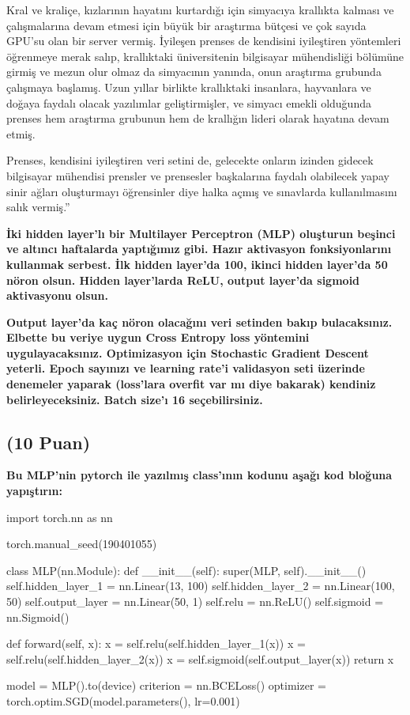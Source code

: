 \documentclass[11pt]{article}
\begin{document}
Kral ve kraliçe, kızlarının hayatını kurtardığı için simyacıya krallıkta kalması ve çalışmalarına devam etmesi için büyük bir araştırma bütçesi ve çok sayıda GPU'su olan bir server vermiş. İyileşen prenses de kendisini iyileştiren yöntemleri öğrenmeye merak salıp, krallıktaki üniversitenin bilgisayar mühendisliği bölümüne girmiş ve mezun olur olmaz da simyacının yanında, onun araştırma grubunda çalışmaya başlamış. Uzun yıllar birlikte krallıktaki insanlara, hayvanlara ve doğaya faydalı olacak yazılımlar geliştirmişler, ve simyacı emekli olduğunda prenses hem araştırma grubunun hem de krallığın lideri olarak hayatına devam etmiş.

Prenses, kendisini iyileştiren veri setini de, gelecekte onların izinden gidecek bilgisayar mühendisi prensler ve prensesler başkalarına faydalı olabilecek yapay sinir ağları oluşturmayı öğrensinler diye halka açmış ve sınavlarda kullanılmasını salık vermiş.''

\textbf{İki hidden layer'lı bir Multilayer Perceptron (MLP) oluşturun beşinci ve altıncı haftalarda yaptığımız gibi. Hazır aktivasyon fonksiyonlarını kullanmak serbest. İlk hidden layer'da 100, ikinci hidden layer'da 50 nöron olsun. Hidden layer'larda ReLU, output layer'da sigmoid aktivasyonu olsun.}

\textbf{Output layer'da kaç nöron olacağını veri setinden bakıp bulacaksınız. Elbette bu veriye uygun Cross Entropy loss yöntemini uygulayacaksınız. Optimizasyon için Stochastic Gradient Descent yeterli. Epoch sayınızı ve learning rate'i validasyon seti üzerinde denemeler yaparak (loss'lara overfit var mı diye bakarak) kendiniz belirleyeceksiniz. Batch size'ı 16 seçebilirsiniz.}


\subsection{(10 Puan)} \textbf{Bu MLP'nin pytorch ile yazılmış class'ının kodunu aşağı kod bloğuna yapıştırın:}

\begin{python}
import torch.nn as nn

torch.manual_seed(190401055)

class MLP(nn.Module):
    def __init__(self):
        super(MLP, self).__init__()
        self.hidden_layer_1 = nn.Linear(13, 100)
        self.hidden_layer_2 = nn.Linear(100, 50)
        self.output_layer = nn.Linear(50, 1)
        self.relu = nn.ReLU()
        self.sigmoid = nn.Sigmoid()

    def forward(self, x):
        x = self.relu(self.hidden_layer_1(x))
        x = self.relu(self.hidden_layer_2(x))
        x = self.sigmoid(self.output_layer(x))
        return x

model = MLP().to(device)
criterion = nn.BCELoss()
optimizer = torch.optim.SGD(model.parameters(), lr=0.001)
\end{python}
\end{document}
